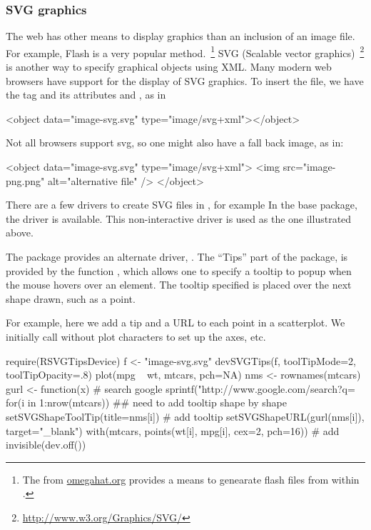 \subsubsection{SVG graphics}
\label{sec:svg-graphics}
The web has other means to display graphics than an inclusion of an
image file. For example, Flash is a very popular method.~\footnote{The
   from \url{omegahat.org} provides a means to
  genearate flash files from within \R.} SVG (Scalable vector graphics)~\footnote{\url{http://www.w3.org/Graphics/SVG/}} is another way to specify graphical objects using XML. Many modern web browsers have support for
the display of SVG graphics. To insert the file, we have the
 tag and its attributes  and
, as in
\begin{HTMLinput}
<object data="image-svg.svg" type="image/svg+xml"></object> 
\end{HTMLinput}
Not all browsers support svg, so one might also have a fall back
image, as in:
\begin{HTMLinput}
<object data="image-svg.svg" type="image/svg+xml">
<img src="image-png.png" alt="alternative file" /> 
</object> 
\end{HTMLinput}

There are a few drivers to create SVG files in \R, for example In the base
 package, the driver  is available.  This non-interactive
driver is used as the  one illustrated above.


The  package provides an alternate driver,
.  The ``Tips'' part of the package, is provided
by the function , which allows one to
specify a tooltip to popup when the mouse hovers over an element. The
tooltip specified is placed over the next shape drawn, such as a
point.

For example, here we add a tip and a URL to each point in a
scatterplot. We initially call  without plot characters to
set up the axes, etc.
\begin{Schunk}
\begin{Sinput}
 require(RSVGTipsDevice)
 f <- "image-svg.svg"
 devSVGTips(f, toolTipMode=2, toolTipOpacity=.8) 
 plot(mpg ~ wt, mtcars, pch=NA) 
 nms <- rownames(mtcars) 
 gurl <- function(x)                     # search google
   sprintf("http://www.google.com/search?q=%s", x)
 for(i in 1:nrow(mtcars)) { 
   ## need to add tooltip shape by shape 
   setSVGShapeToolTip(title=nms[i])    # add tooltip 
   setSVGShapeURL(gurl(nms[i]), target="_blank")
   with(mtcars, points(wt[i], mpg[i], cex=2, pch=16)) # add
 } 
 invisible(dev.off())
\end{Sinput}
\end{Schunk}




